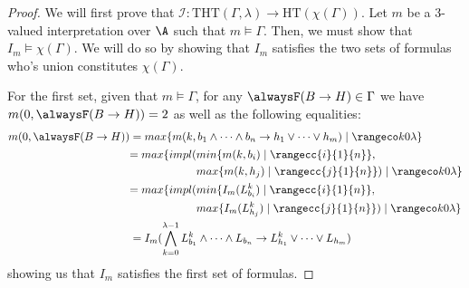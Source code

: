 \begin{proof}
  We will first prove that
  $\mathcal{I}: \text{THT}(\Gamma,\lambda) \rightarrow
  \text{HT}(\chi(\Gamma))$. Let $m$ be a 3-valued interpretation over
  $\A$ such that $m \models \Gamma$. Then, we must show that
  $I_m \models \chi(\Gamma)$. We will do so by showing that $I_m$
  satisfies the two sets of formulas who's union constitutes
  $\chi(\Gamma)$.

  For the first set, given that $m \models \Gamma$, for any
  $\tempruleshort \in \Gamma$ we have $m(0,\tempruleshort)=2$ as well
  as the following equalities:
  \begin{align*}
  m(0,\tempruleshort)& = max\{ m(k, \lrulelong ) \mid \kinlambda \}\\
  &\begin{aligned} = max\{ impl(&min\{ m(k,b_i) \mid \rangecc{i}{1}{n} \},\\
                               &max\{ m(k,h_j) \mid \rangecc{j}{1}{n} \}) \mid \kinlambda \}\end{aligned}\\
  &\begin{aligned} = max\{ impl(&min\{ I_m(L^k_{b_i}) \mid \rangecc{i}{1}{n} \},\\
                                &max\{ I_m(L^k_{h_j}) \mid \rangecc{j}{1}{n} \}) \mid \kinlambda \}\end{aligned}\\
  &= I_m(\bigwedge_{k=0}^{\lambda-1} L_{b_1}^k \land \dots \land L_{b_n} \rightarrow L_{h_1}^k \lor \dots \lor L_{h_m})
  \end{align*}
  showing us that $I_m$ satisfies the first set of formulas.


\end{proof}
